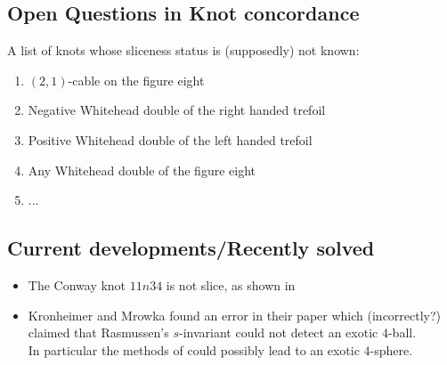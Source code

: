 \subsection{Open Questions in Knot concordance}

A list of knots whose sliceness status is (supposedly) not known:
\begin{enumerate}
	\item $(2, 1)$-cable on the figure eight
	\item Negative Whitehead double of the right handed trefoil
	\item Positive Whitehead double of the left handed trefoil
	\item Any Whitehead double of the figure eight
	\item ...
\end{enumerate}


\subsection{Current developments/Recently solved}

\begin{itemize}
	\item The Conway knot $11n34$ is not slice, as shown
	in \citep{piccirillo2018conway}
	
	\item Kronheimer and Mrowka found an error
	in their paper \citep{kronheimer2013gauge} which
	(incorrectly?) claimed that Rasmussen's $s$-invariant could
	not detect an exotic $4$-ball. \\
	In particular the methods of
	\citep{freedman2009man} could possibly lead
	to an
	exotic $4$-sphere.
	
\end{itemize}